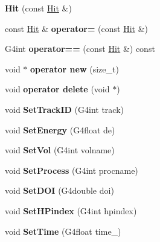 \begin{DoxyCompactItemize}
\item 
\hypertarget{class_hit_aba76ed69da9702babd48e6d6fd89ddbd}{}\label{class_hit_aba76ed69da9702babd48e6d6fd89ddbd} 
{\bfseries Hit} (const \hyperlink{class_hit}{Hit} \&)
\item 
\hypertarget{class_hit_aac29fccde18f50a81d0c977a0ae8e5df}{}\label{class_hit_aac29fccde18f50a81d0c977a0ae8e5df} 
const \hyperlink{class_hit}{Hit} \& {\bfseries operator=} (const \hyperlink{class_hit}{Hit} \&)
\item 
\hypertarget{class_hit_a8176a2813547e92ace0f64e5fe428784}{}\label{class_hit_a8176a2813547e92ace0f64e5fe428784} 
G4int {\bfseries operator==} (const \hyperlink{class_hit}{Hit} \&) const
\item 
\hypertarget{class_hit_ade61deada1dde7aab01825ce3d4426fb}{}\label{class_hit_ade61deada1dde7aab01825ce3d4426fb} 
void $\ast$ {\bfseries operator new} (size\+\_\+t)
\item 
\hypertarget{class_hit_a08a30c652e131c77702231970c0f683b}{}\label{class_hit_a08a30c652e131c77702231970c0f683b} 
void {\bfseries operator delete} (void $\ast$)
\item 
\hypertarget{class_hit_a9a89a5dfbb6cc68d2795a1a200cf3076}{}\label{class_hit_a9a89a5dfbb6cc68d2795a1a200cf3076} 
void {\bfseries Set\+Track\+ID} (G4int track)
\item 
\hypertarget{class_hit_a78bab760d1e79a09cf75d5b4a6fb1435}{}\label{class_hit_a78bab760d1e79a09cf75d5b4a6fb1435} 
void {\bfseries Set\+Energy} (G4float de)
\item 
\hypertarget{class_hit_ae97cc0247c86847955835ce3d53d90d1}{}\label{class_hit_ae97cc0247c86847955835ce3d53d90d1} 
void {\bfseries Set\+Vol} (G4int volname)
\item 
\hypertarget{class_hit_aba2fe7b6fdb377ce788d57fd0bd29431}{}\label{class_hit_aba2fe7b6fdb377ce788d57fd0bd29431} 
void {\bfseries Set\+Process} (G4int procname)
\item 
\hypertarget{class_hit_a869176ee6f75f19dbf624d181498fd61}{}\label{class_hit_a869176ee6f75f19dbf624d181498fd61} 
void {\bfseries Set\+D\+OI} (G4double doi)
\item 
\hypertarget{class_hit_a268f8c747880c070149edca1fa3b831b}{}\label{class_hit_a268f8c747880c070149edca1fa3b831b} 
void {\bfseries Set\+H\+Pindex} (G4int hpindex)
\item 
\hypertarget{class_hit_a6f4b0205d9f92e35c2eb7fc4d82f2657}{}\label{class_hit_a6f4b0205d9f92e35c2eb7fc4d82f2657} 
void {\bfseries Set\+Time} (G4float time\+\_\+)

\end{DoxyCompactItemize}
